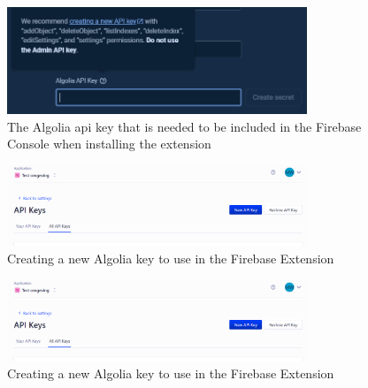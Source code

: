 \begin{figure}[htbp]
      \centering
      \includegraphics[width=0.8\textwidth]{Figures/Algolia API Key needed.png}
      \caption{The Algolia \acrshort{api} key that is needed to be included in the Firebase Console when installing the extension}
\end{figure}

\begin{figure}[htbp]
      \centering
      \includegraphics[width=0.8\textwidth]{Figures/Create new Algolia keys.png}
      \caption{Creating a new Algolia key to use in the Firebase Extension}
\end{figure}

\begin{figure}[htbp]
      \centering
      \includegraphics[width=0.8\textwidth]{Figures/Create new Algolia keys.png}
      \caption{Creating a new Algolia key to use in the Firebase Extension}
\end{figure}

